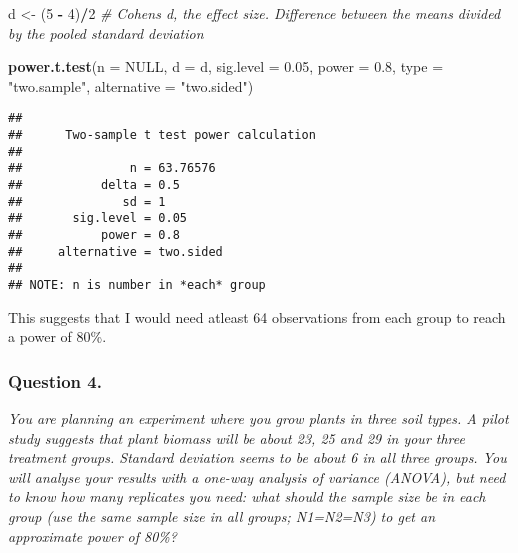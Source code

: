 \documentclass[
]{article}
\newenvironment{Shaded}{\begin{snugshade}}{\end{snugshade}}
\newcommand{\AttributeTok}[1]{\textcolor[rgb]{0.13,0.29,0.53}{#1}}
\newcommand{\CommentTok}[1]{\textcolor[rgb]{0.56,0.35,0.01}{\textit{#1}}}
\newcommand{\ConstantTok}[1]{\textcolor[rgb]{0.56,0.35,0.01}{#1}}
\newcommand{\DecValTok}[1]{\textcolor[rgb]{0.00,0.00,0.81}{#1}}
\newcommand{\FloatTok}[1]{\textcolor[rgb]{0.00,0.00,0.81}{#1}}
\newcommand{\FunctionTok}[1]{\textcolor[rgb]{0.13,0.29,0.53}{\textbf{#1}}}
\newcommand{\NormalTok}[1]{#1}
\newcommand{\OtherTok}[1]{\textcolor[rgb]{0.56,0.35,0.01}{#1}}
\newcommand{\SpecialCharTok}[1]{\textcolor[rgb]{0.81,0.36,0.00}{\textbf{#1}}}
\newcommand{\StringTok}[1]{\textcolor[rgb]{0.31,0.60,0.02}{#1}}
\begin{document}
\begin{Shaded}
\begin{Highlighting}[]
\NormalTok{d }\OtherTok{\textless{}{-}}\NormalTok{ (}\DecValTok{5} \SpecialCharTok{{-}} \DecValTok{4}\NormalTok{)}\SpecialCharTok{/}\DecValTok{2}    \CommentTok{\# Cohen\textquotesingle{}s d, the effect size. Difference between the means divided by the pooled standard deviation}

\FunctionTok{power.t.test}\NormalTok{(}\AttributeTok{n =} \ConstantTok{NULL}\NormalTok{, }\AttributeTok{d =}\NormalTok{ d, }\AttributeTok{sig.level =} \FloatTok{0.05}\NormalTok{, }\AttributeTok{power =} \FloatTok{0.8}\NormalTok{, }\AttributeTok{type =} \StringTok{"two.sample"}\NormalTok{, }\AttributeTok{alternative =} \StringTok{"two.sided"}\NormalTok{)}
\end{Highlighting}
\end{Shaded}

\begin{verbatim}
## 
##      Two-sample t test power calculation 
## 
##               n = 63.76576
##           delta = 0.5
##              sd = 1
##       sig.level = 0.05
##           power = 0.8
##     alternative = two.sided
## 
## NOTE: n is number in *each* group
\end{verbatim}

This suggests that I would need atleast 64 observations from each group
to reach a power of 80\%.

\subsubsection{Question 4.}\label{question-4.}

\emph{You are planning an experiment where you grow plants in three soil
types. A pilot study suggests that plant biomass will be about 23, 25
and 29 in your three treatment groups. Standard deviation seems to be
about 6 in all three groups. You will analyse your results with a
one-way analysis of variance (ANOVA), but need to know how many
replicates you need: what should the sample size be in each group (use
the same sample size in all groups; N1=N2=N3) to get an approximate
power of 80\%?}
\end{document}
